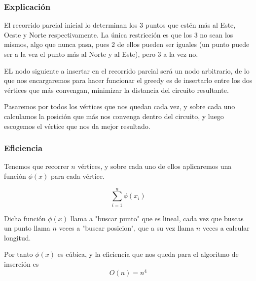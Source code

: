 \subsubsection{Explicación}
El recorrido parcial inicial lo determinan los 3 puntos que estén más al Este, Oeste y Norte respectivamente. La única restricción es que los 3 no sean los mismos, algo que nunca pasa, pues 2 de ellos pueden ser iguales (un punto puede ser a la vez el punto más al Norte y al Este), pero 3 a la vez no.

EL nodo siguiente a insertar en el recorrido parcial será un nodo arbitrario, de lo que nos encargaremos para hacer funcionar el greedy es de insertarlo entre los dos vértices que más convengan, minimizar la distancia del circuito resultante.

Pasaremos por todos los vértices que nos quedan cada vez, y sobre cada uno calculamos la posición que más nos convenga dentro del circuito, y luego escogemos el vértice que nos da mejor resultado.

\subsubsection{Eficiencia}
Tenemos que recorrer $n$ vértices, y sobre cada uno de ellos aplicaremos una función $\phi(x)$ para cada vértice.

\[ \sum_{i=1}^{n} \phi(x_i)\]

Dicha función $\phi(x)$ llama a "buscar punto" que es lineal, cada vez que buscas un punto llama $n$ veces a "buscar posicion", que a su vez llama $n$ veces a calcular longitud.

Por tanto $\phi(x)$ es cúbica, y la eficiencia que nos queda para el algoritmo de inserción es
\[ O(n) = n^4 \]